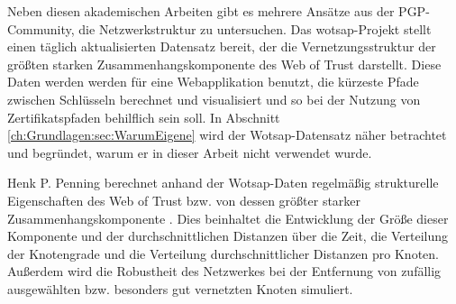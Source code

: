 Neben diesen akademischen Arbeiten gibt es mehrere Ansätze aus der
PGP-Community, die Netzwerkstruktur zu untersuchen. Das
wotsap-Projekt\cite{Cederlof} stellt einen täglich aktualisierten
Datensatz bereit, der die Vernetzungsstruktur der größten starken
Zusammenhangskomponente des Web of Trust darstellt. Diese Daten werden
werden für eine Webapplikation benutzt, die kürzeste Pfade
zwischen Schlüsseln berechnet und visualisiert und so bei der
Nutzung von Zertifikatspfaden behilflich sein soll. In Abschnitt
\ref{ch:Grundlagen:sec:WarumEigene} wird der Wotsap-Datensatz näher
betrachtet und begründet, warum er in dieser Arbeit nicht verwendet
wurde. 

Henk P. Penning berechnet anhand der Wotsap-Daten regelmäßig
strukturelle Eigenschaften des Web of Trust bzw. von dessen größter
starker Zusammenhangskomponente \cite{Penning}. Dies beinhaltet die
Entwicklung der Größe dieser Komponente und der durchschnittlichen
Distanzen über die Zeit, die Verteilung der Knotengrade und die
Verteilung durchschnittlicher Distanzen pro Knoten. Außerdem wird die
Robustheit des Netzwerkes bei der Entfernung von zufällig
ausgewählten bzw. besonders gut vernetzten Knoten simuliert.

